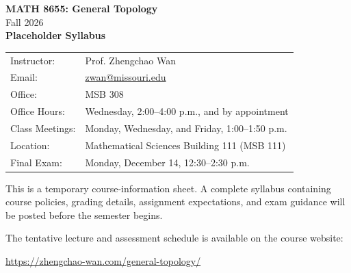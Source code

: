 \documentclass[11pt]{article}
\begin{document}
\begin{center}
  {\LARGE\bfseries MATH 8655: General Topology}\\[0.4em]
  {\large Fall 2026}\\[1.5em]
  {\Large\bfseries Placeholder Syllabus}
\end{center}

\vspace{1.5em}

\noindent
\begin{tabular}{@{}ll@{}}
Instructor: & Prof. Zhengchao Wan \\
Email: & \href{mailto:zwan@missouri.edu}{zwan@missouri.edu} \\
Office: & MSB 308 \\
Office Hours: & Wednesday, 2:00--4:00 p.m., and by appointment \\
Class Meetings: & Monday, Wednesday, and Friday, 1:00--1:50 p.m. \\
Location: & Mathematical Sciences Building 111 (MSB 111) \\
Final Exam: & Monday, December 14, 12:30--2:30 p.m.
\end{tabular}

\vspace{2em}

This is a temporary course-information sheet. A complete syllabus containing
course policies, grading details, assignment expectations, and exam guidance
will be posted before the semester begins.

\vspace{1em}

The tentative lecture and assessment schedule is available on the course
website:
\begin{center}
  \url{https://zhengchao-wan.com/general-topology/}
\end{center}
\end{document}
